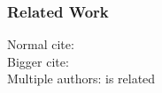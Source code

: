 \documentclass[noshadow, aspectratio=169]{LSRslides}
\begin{document}
\begin{frame}
	\frametitle{Related Work}
    Normal cite: \cite{buss11}\\
	Bigger cite: \\
	Multiple  authors: \cite[3]{bauer09} is related
\end{frame}




{
    \begin{frame}[plain]
    \end{frame}
}

\end{document}
